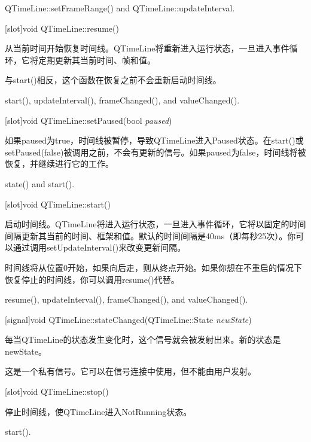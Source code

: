 \begin{seeAlso}
QTimeLine::setFrameRange() and QTimeLine::updateInterval.
\end{seeAlso}

[slot]void QTimeLine::resume()

从当前时间开始恢复时间线。QTimeLine将重新进入运行状态，一旦进入事件循环，它将定期更新其当前时间、帧和值。

与start()相反，这个函数在恢复之前不会重新启动时间线。

\begin{seeAlso}
start(), updateInterval(), frameChanged(), and valueChanged().
\end{seeAlso}

[slot]void QTimeLine::setPaused(bool \emph{paused})

如果paused为true，时间线被暂停，导致QTimeLine进入Paused状态。在start()或setPaused(false)被调用之前，不会有更新的信号。如果paused为false，时间线将被恢复，并继续进行它的工作。

\begin{seeAlso}
state() and start().
\end{seeAlso}

[slot]void QTimeLine::start()

启动时间线。QTimeLine将进入运行状态，一旦进入事件循环，它将以固定的时间间隔更新其当前的时间、框架和值。默认的时间间隔是40ms（即每秒25次）。你可以通过调用setUpdateInterval()来改变更新间隔。

时间线将从位置0开始，如果向后走，则从终点开始。如果你想在不重启的情况下恢复停止的时间线，你可以调用resume()代替。

\begin{seeAlso}
resume(), updateInterval(), frameChanged(), and valueChanged().
\end{seeAlso}

[signal]void QTimeLine::stateChanged(QTimeLine::State \emph{newState})

每当QTimeLine的状态发生变化时，这个信号就会被发射出来。新的状态是newState。

\begin{notice}
这是一个私有信号。它可以在信号连接中使用，但不能由用户发射。
\end{notice}

[slot]void QTimeLine::stop()

停止时间线，使QTimeLine进入NotRunning状态。

\begin{seeAlso}
start().
\end{seeAlso}

